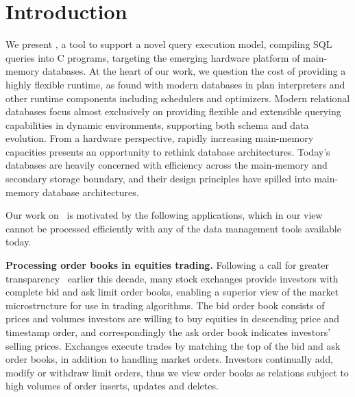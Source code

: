 \section{Introduction}
We present \compiler, a tool to support a novel query execution model, compiling
SQL queries into C programs, targeting the emerging hardware platform of
main-memory databases. At the heart of our work, we question the cost of
providing a highly flexible runtime, as found with modern databases in plan
interpreters and other runtime components including schedulers and optimizers.
Modern relational databases focus almost exclusively on providing flexible and
extensible querying capabilities in dynamic environments, supporting both schema
and data evolution. From a hardware perspective, rapidly increasing main-memory
capacities presents an opportunity to rethink database architectures. Today's
databases are heavily concerned with efficiency across the main-memory and
secondary storage boundary, and their design principles have spilled
into main-memory database architectures.

Our work on \compiler\ is motivated by the following applications, which in
our view cannot be processed efficiently with any of the data management tools
available today.

\noindent \textbf{Processing order books in equities trading.}
Following a call for greater transparency~\cite{sec-orderbook:00} earlier this
decade, many stock exchanges provide investors with complete bid and ask limit
order books, enabling a superior view of the market microstructure for use in
trading algorithms. The bid order book consists of prices and volumes investors
are willing to buy equities in descending price and timestamp order, and
correspondingly the ask order book indicates investors' selling prices. Exchanges
execute trades by matching the top of the bid and ask order books, in addition to
handling market orders. Investors continually add, modify or withdraw limit
orders, thus we view order books as relations subject to high volumes of order
inserts, updates and deletes.

